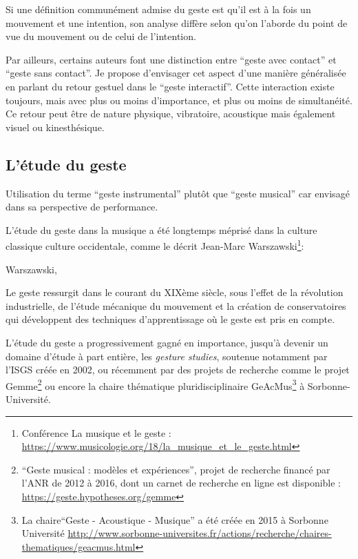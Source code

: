 Si une définition communément admise du geste est qu'il est à la fois un mouvement et une intention, son analyse diffère selon qu'on l'aborde du point de vue du mouvement ou de celui de l'intention.

Par ailleurs, certains auteurs font une distinction entre ``geste avec contact'' et ``geste sans contact''. Je propose d'envisager cet aspect d'une manière généralisée en parlant du retour gestuel dans le ``geste interactif''. Cette interaction existe toujours, mais avec plus ou moins d'importance, et plus ou moins de simultanéité. Ce retour peut être de nature physique, vibratoire, acoustique mais également visuel ou kinesthésique.

\subsection{L'étude du geste}

Utilisation du terme ``geste instrumental'' plutôt que ``geste musical'' car envisagé dans sa perspective de performance. 

L'étude du geste dans la musique a été longtemps méprisé dans la culture classique culture occidentale, comme le décrit Jean-Marc Warszawski\footnote{Conférence La musique et le geste : \url{https://www.musicologie.org/18/la_musique_et_le_geste.html}}:

 Warszawski,

Le geste ressurgit dans le courant du XIXème siècle, sous l'effet de la révolution industrielle, de l'étude mécanique du mouvement et la création de conservatoires qui développent des techniques d'apprentissage où le geste est pris en compte. 

L'étude du geste a progressivement gagné en importance, jusqu'à devenir un domaine d'étude à part entière, les \textit{gesture studies}, soutenue notamment par l'\gls{ISGS} créée en 2002, ou récemment par des projets de recherche comme le projet Gemme\footnote{``Geste musical : modèles et expériences'', projet de recherche financé par l'ANR de 2012 à 2016, dont un carnet de recherche en ligne est disponible : \url{https://geste.hypotheses.org/gemme}} ou encore la chaire thématique pluridisciplinaire GeAcMus\footnote{La chaire``Geste - Acoustique - Musique'' a été créée en 2015 à Sorbonne Université \url{http://www.sorbonne-universites.fr/actions/recherche/chaires-thematiques/geacmus.html}} à Sorbonne-Université.



